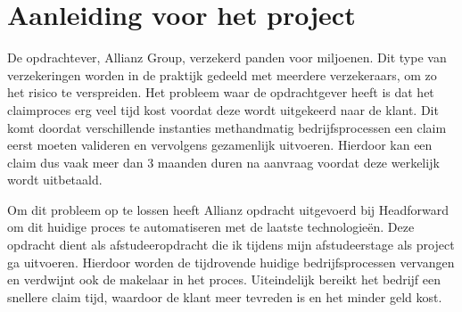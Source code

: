 \chapter{Aanleiding voor het project}
De opdrachtever, Allianz Group, verzekerd panden voor miljoenen. Dit type van verzekeringen worden in de praktijk gedeeld met meerdere verzekeraars, om zo het risico te verspreiden. Het probleem waar de opdrachtgever heeft is dat het claimproces erg veel tijd kost voordat deze wordt uitgekeerd naar de klant. Dit komt doordat verschillende instanties methandmatig bedrijfsprocessen een claim eerst moeten valideren en vervolgens gezamenlijk uitvoeren. Hierdoor kan een claim dus vaak meer dan 3 maanden duren na aanvraag voordat deze werkelijk wordt uitbetaald.\par
Om dit probleem op te lossen heeft Allianz opdracht uitgevoerd bij Headforward om dit huidige proces te automatiseren met de laatste technologieën. Deze opdracht dient als afstudeeropdracht die ik tijdens mijn afstudeerstage als project ga uitvoeren. Hierdoor worden de tijdrovende huidige bedrijfsprocessen vervangen en verdwijnt ook de makelaar in het proces. Uiteindelijk bereikt het bedrijf een snellere claim tijd, waardoor de klant meer tevreden is en het minder geld kost.